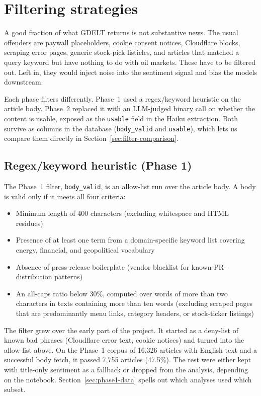 \section{Filtering strategies}\label{sec:filtering}

A good fraction of what GDELT returns is not substantive news. The usual offenders are paywall placeholders, cookie consent notices, Cloudflare blocks, scraping error pages, generic stock-pick listicles, and articles that matched a query keyword but have nothing to do with oil markets. These have to be filtered out. Left in, they would inject noise into the sentiment signal and bias the models downstream.

Each phase filters differently. Phase~1 used a regex/keyword heuristic on the article body. Phase~2 replaced it with an LLM-judged binary call on whether the content is usable, exposed as the \texttt{usable} field in the Haiku extraction. Both survive as columns in the database (\texttt{body\_valid} and \texttt{usable}), which lets us compare them directly in Section~\ref{sec:filter-comparison}.

\subsection{Regex/keyword heuristic (Phase 1)}\label{sec:regex-filter}

The Phase~1 filter, \texttt{body\_valid}, is an allow-list run over the article body. A body is valid only if it meets all four criteria:

\begin{itemize}
  \item Minimum length of 400 characters (excluding whitespace and HTML residues)
  \item Presence of at least one term from a domain-specific keyword list covering energy, financial, and geopolitical vocabulary
  \item Absence of press-release boilerplate (vendor blacklist for known PR-distribution patterns)
  \item An all-caps ratio below 30\%, computed over words of more than two characters in texts containing more than ten words (excluding scraped pages that are predominantly menu links, category headers, or stock-ticker listings)
\end{itemize}

The filter grew over the early part of the project. It started as a deny-list of known bad phrases (Cloudflare error text, cookie notices) and turned into the allow-list above. On the Phase~1 corpus of 16{,}326 articles with English text and a successful body fetch, it passed 7{,}755 articles (47.5\%). The rest were either kept with title-only sentiment as a fallback or dropped from the analysis, depending on the notebook. Section~\ref{sec:phase1-data} spells out which analyses used which subset.

